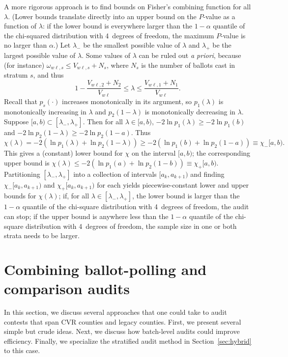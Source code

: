 \documentclass[runningheads]{llncs}
\newcommand{\beq}{\begin{equation}}
\newcommand{\eeq}{\end{equation}}
\begin{document}
A more rigorous approach is to find bounds on Fisher's combining function for all
$\lambda$. 
(Lower bounds translate directly into an upper bound on the $P$-value as a function of
$\lambda$: if the lower bound is 
everywhere larger than the $1-\alpha$ quantile of the chi-squared distribution with 4~degrees of freedom, the maximum $P$-value is no larger than $\alpha$.)
Let $\lambda_-$ be the smallest possible value of $\lambda$ and $\lambda_+$ be the largest
possible value of $\lambda$.
Some values of $\lambda$ can be ruled out \emph{a priori}, because (for instance) $\omega_{w\ell,s} \le
V_{w\ell,s}+N_s$,
where $N_s$ is the number of ballots cast in stratum $s$, and thus
\beq
   1 - \frac{V_{w\ell,2}+N_2}{V_{w\ell}} \le \lambda \le \frac{V_{w\ell,1}+N_1}{V_{w\ell}}.
\eeq
Recall that $p_s(\cdot)$ increases monotonically in its argument, so $p_1(\lambda)$ is
monotonically increasing in $\lambda$ and $p_2(1-\lambda)$ is monotonically decreasing in $\lambda$.
Suppose $[a, b) \subset [\lambda_-, \lambda_+]$.
Then for all $\lambda \in [a, b)$, $-2\ln p_1(\lambda) \ge -2\ln p_1(b)$ and
$-2\ln p_2(1-\lambda) \ge -2\ln p_2(1-a)$.
Thus
\beq
   \chi(\lambda) = -2(\ln p_1(\lambda)+ \ln p_2(1-\lambda))
          \ge -2(\ln p_1(b) + \ln p_2(1-a)) \equiv \chi_-[a,b).
\eeq
This gives a (constant) lower bound for $\chi$ on the interval $[a, b)$; the corresponding 
upper bound is $\chi(\lambda) \le -2(\ln p_1(a) + \ln p_2(1-b)) \equiv \chi_+[a,b)$.
Partitioning $[\lambda_-, \lambda_+]$ into a collection of intervals $[a_k, a_{k+1})$
and finding $\chi_-[a_k, a_{k+1})$ and $\chi_+[a_k, a_{k+1})$ for each
yields piecewise-constant lower and upper bounds for $\chi(\lambda)$; if,
 for all $\lambda \in [\lambda_-, \lambda_+]$, the lower bound
is larger than the $1-\alpha$ quantile of the chi-square distribution with 4~degrees of freedom,
the audit can stop; if the upper bound is anywhere less than the $1-\alpha$ quantile of the chi-square distribution with 4~degrees of freedom, the sample size in one or both strata needs to be larger.



\section{Combining ballot-polling and comparison audits}\label{sec:combiningMethods}

In this section, we discuss several approaches that one could take to audit contests that span
CVR counties and legacy counties.
First, we present several simple but crude ideas.
Next, we discuss how batch-level audits could improve efficiency.
Finally, we specialize the stratified audit method in Section~\ref{sec:hybrid} to this case.
\end{document}
